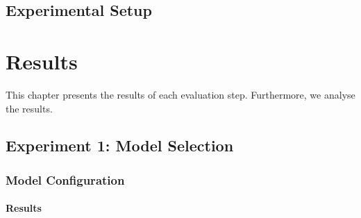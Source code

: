 \documentclass[12pt,a4paper]{report}
\begin{document}
\section{Experimental Setup}
\label{sec:experimental_setup}







\chapter{Results}
\label{sec:results}
This chapter presents the results of each evaluation step. Furthermore, we analyse the results.


% 

% 



% 
% 
% 
\section{Experiment 1: Model Selection}
\subsection{Model Configuration}
\subsubsection{Results}

\end{document}
